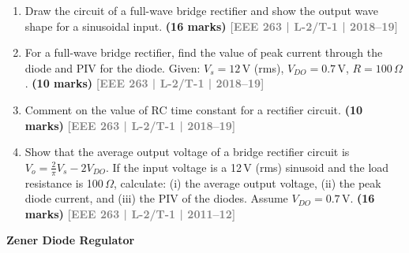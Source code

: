 \documentclass[12pt,a3paper]{article}
\newcommand{\yr}[1]{\hfill\textcolor{gray}{\small\textbf{[#1]}}}
\newcommand{\mk}[1]{\textcolor{orange!70!black}{\small\textbf{(#1 marks)}}}
\newcommand{\subtopic}[2]{%
  \vspace{10pt}
  \noindent\begin{tcolorbox}[colback=#1!8,colframe=#1,boxrule=0.6pt,arc=4pt,
    left=6pt,right=6pt,top=4pt,bottom=4pt]
    \small\bfseries\textcolor{#1}{#2}
  \end{tcolorbox}
  \vspace{2pt}
}
\begin{document}
\begin{enumerate}
\begin{center}

\end{center}
\mk{23} \yr{EEE 263 | L-2/T-1 | 2020--21}

\item Draw the circuit of a full-wave bridge rectifier and show the output wave shape for a sinusoidal input.
\mk{16} \yr{EEE 263 | L-2/T-1 | 2018--19}

\item For a full-wave bridge rectifier, find the value of peak current through the diode and PIV for the diode. Given: $V_s=12\,\text{V}$ (rms), $V_{DO}=0.7\,\text{V}$, $R=100\,\Omega$.
\mk{10} \yr{EEE 263 | L-2/T-1 | 2018--19}

\item Comment on the value of RC time constant for a rectifier circuit.
\mk{10} \yr{EEE 263 | L-2/T-1 | 2018--19}



\item Show that the average output voltage of a bridge rectifier circuit is $V_o = \frac{2}{\pi}V_s - 2V_{DO}$. If the input voltage is a 12\,V (rms) sinusoid and the load resistance is 100\,$\Omega$, calculate: (i) the average output voltage, (ii) the peak diode current, and (iii) the PIV of the diodes. Assume $V_{DO}=0.7\,\text{V}$.
\mk{16} \yr{EEE 263 | L-2/T-1 | 2011--12}

\end{enumerate}

\subtopic{cA}{Zener Diode Regulator}
\label{sub:s1-zener}
\end{document}
